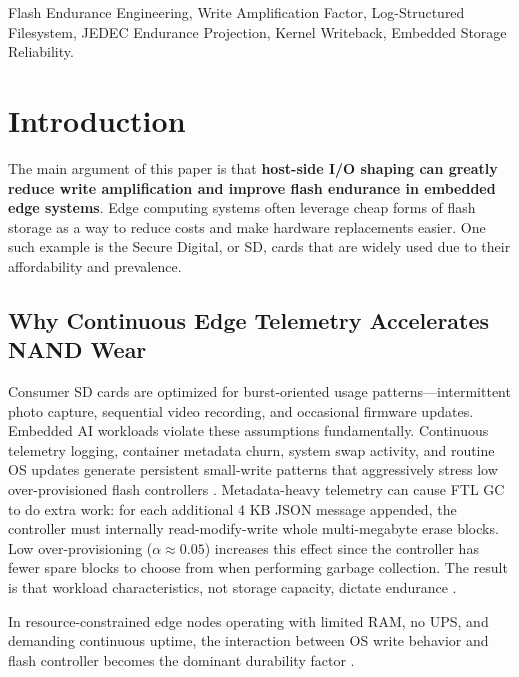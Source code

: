 \documentclass[conference]{IEEEtran}
\begin{document}
\begin{IEEEkeywords}
Flash Endurance Engineering, Write Amplification Factor, Log-Structured Filesystem, JEDEC Endurance Projection, Kernel Writeback, Embedded Storage Reliability.
\end{IEEEkeywords}

\section{Introduction}

The main argument of this paper is that \textbf{host-side I/O shaping can greatly reduce write amplification and improve flash endurance in embedded edge systems}. Edge computing systems often leverage cheap forms of flash storage as a way to reduce costs and make hardware replacements easier. One such example is the Secure Digital, or SD, cards that are widely used due to their affordability and prevalence.

\subsection{Why Continuous Edge Telemetry Accelerates NAND Wear}
Consumer SD cards are optimized for burst-oriented usage patterns---intermittent photo capture, sequential video recording, and occasional firmware updates. Embedded AI workloads violate these assumptions fundamentally. Continuous telemetry logging, container metadata churn, system swap activity, and routine OS updates generate persistent small-write patterns that aggressively stress low over-provisioned flash controllers \cite{b26}. Metadata-heavy telemetry can cause FTL GC to do extra work: for each additional 4 KB JSON message appended, the controller must internally read-modify-write whole multi-megabyte erase blocks. Low over-provisioning ($\alpha \approx 0.05$) increases this effect since the controller has fewer spare blocks to choose from when performing garbage collection. The result is that workload characteristics, not storage capacity, dictate endurance \cite{b10}.

In resource-constrained edge nodes operating with limited RAM, no UPS, and demanding continuous uptime, the interaction between OS write behavior and flash controller becomes the dominant durability factor \cite{b30}.
\end{document}
